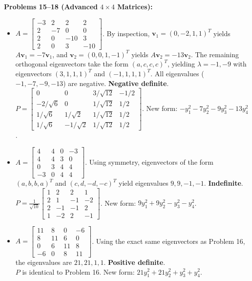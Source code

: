 \documentclass[11pt, letterpaper]{article}
\theoremstyle{definition}
\theoremstyle{remark}
\begin{document}
\textbf{Problems 15--18 (Advanced $4 \times 4$ Matrices):}
\begin{itemize}
    \item[\textbf{15.}] $A = \begin{bmatrix} -3 & 2 & 2 & 2 \\ 2 & -7 & 0 & 0 \\ 2 & 0 & -10 & 3 \\ 2 & 0 & 3 & -10 \end{bmatrix}$. By inspection, $\mathbf{v}_1 = (0, -2, 1, 1)^T$ yields $A\mathbf{v}_1 = -7\mathbf{v}_1$, and $\mathbf{v}_2 = (0, 0, 1, -1)^T$ yields $A\mathbf{v}_2 = -13\mathbf{v}_2$. The remaining orthogonal eigenvectors take the form $(a, c, c, c)^T$, yielding $\lambda = -1, -9$ with eigenvectors $(3, 1, 1, 1)^T$ and $(-1, 1, 1, 1)^T$. All eigenvalues ($-1, -7, -9, -13$) are negative. \textbf{Negative definite}. \\
    $P = \begin{bmatrix} 0 & 0 & 3/\sqrt{12} & -1/2 \\ -2/\sqrt{6} & 0 & 1/\sqrt{12} & 1/2 \\ 1/\sqrt{6} & 1/\sqrt{2} & 1/\sqrt{12} & 1/2 \\ 1/\sqrt{6} & -1/\sqrt{2} & 1/\sqrt{12} & 1/2 \end{bmatrix}$. New form: $-y_1^2 - 7y_2^2 - 9y_3^2 - 13y_4^2$.

    \item[\textbf{16.}] $A = \begin{bmatrix} 4 & 4 & 0 & -3 \\ 4 & 4 & 3 & 0 \\ 0 & 3 & 4 & 4 \\ -3 & 0 & 4 & 4 \end{bmatrix}$. Using symmetry, eigenvectors of the form $(a, b, b, a)^T$ and $(c, d, -d, -c)^T$ yield eigenvalues $9, 9, -1, -1$. \textbf{Indefinite}. \\
    $P = \frac{1}{\sqrt{10}} \begin{bmatrix} 1 & 2 & 2 & 1 \\ 2 & 1 & -1 & -2 \\ 2 & -1 & -1 & 2 \\ 1 & -2 & 2 & -1 \end{bmatrix}$. New form: $9y_1^2 + 9y_2^2 - y_3^2 - y_4^2$.

    \item[\textbf{17.}] $A = \begin{bmatrix} 11 & 8 & 0 & -6 \\ 8 & 11 & 6 & 0 \\ 0 & 6 & 11 & 8 \\ -6 & 0 & 8 & 11 \end{bmatrix}$. Using the exact same eigenvectors as Problem 16, the eigenvalues are $21, 21, 1, 1$. \textbf{Positive definite}. \\
    $P$ is identical to Problem 16. New form: $21y_1^2 + 21y_2^2 + y_3^2 + y_4^2$.


\end{itemize}
\end{document}
